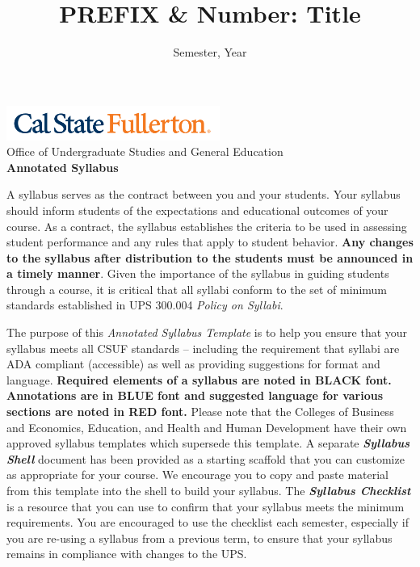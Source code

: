 \documentclass[12pt]{article}
\title{PREFIX \& Number: Title}
\author{}
\date{Semester, Year}
\begin{document}
\begin{center}
\includegraphics[width=2.75in, alt={Cal State Fullerton wordmark}]{csuf_logo.png}\\
\vspace{0.5em}
{\large Office of Undergraduate Studies and General Education}\\
\vspace{1em}
{\Large \textbf{Annotated Syllabus}}
\end{center}

\vspace{1em}
\noindent A syllabus serves as the contract between you and your students. Your syllabus should inform students of the expectations and educational outcomes of your course. As a contract, the syllabus establishes the criteria to be used in assessing student performance and any rules that apply to student behavior. \textbf{Any changes to the syllabus after distribution to the students must be announced in a timely manner}. Given the importance of the syllabus in guiding students through a course, it is critical that all syllabi conform to the set of minimum standards established in UPS 300.004 \textit{Policy on Syllabi}.

\vspace{1em}

\noindent The purpose of this \textit{Annotated Syllabus Template} is to help you ensure that your syllabus meets all CSUF standards -- including the requirement that syllabi are ADA compliant (accessible) as well as providing suggestions for format and language. \textbf{Required elements of a syllabus are noted in BLACK font. Annotations are in BLUE font and suggested language for various sections are noted in RED font.} Please note that the Colleges of Business and Economics, Education, and Health and Human Development have their own approved syllabus templates which supersede this template. A separate \textbf{\textit{Syllabus Shell}} document has been provided as a starting scaffold that you can customize as appropriate for your course. We encourage you to copy and paste material from this template into the shell to build your syllabus. The \textbf{\textit{Syllabus Checklist}} is a resource that you can use to confirm that your syllabus meets the minimum requirements. You are encouraged to use the checklist each semester, especially if you are re-using a syllabus from a previous term, to ensure that your syllabus remains in compliance with changes to the UPS.
\end{document}
